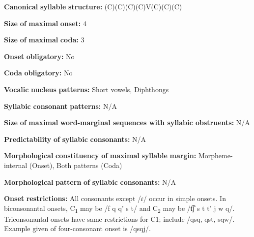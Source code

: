 \begin{styleBody}
\textbf{Canonical} \textbf{syllable} \textbf{structure:} (C)(C)(C)(C)V(C)(C)(C) \citep[391-401]{Clairis1985}
\end{styleBody}

\begin{styleBody}
\textbf{Size} \textbf{of} \textbf{maximal} \textbf{onset:} 4
\end{styleBody}

\begin{styleBody}
\textbf{Size} \textbf{of} \textbf{maximal} \textbf{coda:} 3
\end{styleBody}

\begin{styleBody}
\textbf{Onset} \textbf{obligatory:} No
\end{styleBody}

\begin{styleBody}
\textbf{Coda} \textbf{obligatory:} No
\end{styleBody}

\begin{styleBody}
\textbf{Vocalic} \textbf{nucleus} \textbf{patterns:} Short vowels, Diphthongs
\end{styleBody}

\begin{styleBody}
\textbf{Syllabic} \textbf{consonant} \textbf{patterns:} N/A
\end{styleBody}

\begin{styleBody}
\textbf{Size} \textbf{of} \textbf{maximal} \textbf{word{}-marginal sequences with syllabic obstruents:} N/A
\end{styleBody}

\begin{styleBody}
\textbf{Predictability} \textbf{of} \textbf{syllabic} \textbf{consonants:} N/A 
\end{styleBody}

\begin{styleBody}
\textbf{Morphological} \textbf{constituency} \textbf{of} \textbf{maximal} \textbf{syllable} \textbf{margin:} Morpheme-internal (Onset), Both patterns (Coda)
\end{styleBody}

\begin{styleBody}
\textbf{Morphological} \textbf{pattern} \textbf{of} \textbf{syllabic} \textbf{consonants:} N/A
\end{styleBody}

\begin{styleBody}
\textbf{Onset} \textbf{restrictions:} All consonants except /ɾ/ occur in simple onsets. In biconsonantal onsets, C\textsubscript{1} may be /f q q' s t/ and C\textsubscript{2} may be /t͡ʃ s t t' j w q/. Triconsonantal onsets have same restrictions for C1; include /qsq, qst, sqw/. Example given of four-consonant onset is /qsqj/.
\end{styleBody}

